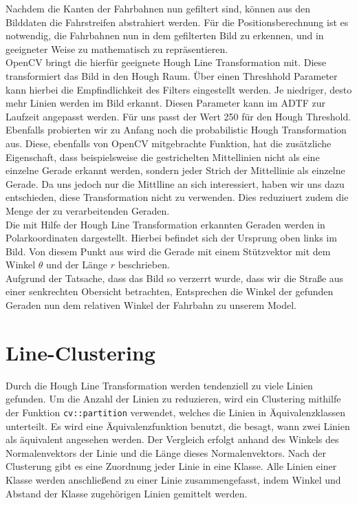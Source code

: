 \documentclass[a4paper,12pt]{report}
\begin{document}
	Nachdem die Kanten der Fahrbahnen nun gefiltert sind, können aus den Bilddaten die Fahrstreifen abstrahiert werden. Für die Positionsberechnung ist es notwendig, die Fahrbahnen nun in dem gefilterten Bild zu erkennen, und in geeigneter Weise zu mathematisch zu repräsentieren. \\
	OpenCV bringt die hierfür geeignete Hough Line Transformation mit. Diese transformiert das Bild in den Hough Raum. Über einen Threshhold Parameter kann hierbei die Empfindlichkeit des Filters eingestellt werden. Je niedriger, desto mehr Linien werden im Bild erkannt. Diesen Parameter kann im ADTF zur Laufzeit angepasst werden. Für uns passt der Wert 250 für den Hough Threshold.\\
	Ebenfalls probierten wir zu Anfang noch die probabilistic Hough Transformation aus. Diese, ebenfalls von OpenCV mitgebrachte Funktion, hat die zusätzliche Eigenschaft, dass beispielsweise die gestrichelten Mittellinien nicht als eine einzelne Gerade erkannt werden, sondern jeder Strich der Mittellinie als einzelne Gerade. Da uns jedoch nur die Mittlline an sich interessiert, haben wir uns dazu entschieden, diese Transformation nicht zu verwenden. Dies reduziuert zudem die Menge der zu verarbeitenden Geraden.\\
	Die mit Hilfe der Hough Line Transformation erkannten Geraden werden in Polarkoordinaten dargestellt. Hierbei befindet sich der Ursprung oben links im Bild. Von diesem Punkt aus wird die Gerade mit einem Stützvektor mit dem Winkel $\theta$ und der Länge $r$ beschrieben.\\
	Aufgrund der Tatsache, dass das Bild so verzerrt wurde, dass wir die Straße aus einer senkrechten Obersicht betrachten, Entsprechen die Winkel der gefunden Geraden nun dem relativen Winkel der Fahrbahn zu unserem Model.

\section{Line-Clustering}
	Durch die Hough Line Transformation werden tendenziell zu viele Linien gefunden. Um die Anzahl der Linien zu reduzieren, wird ein Clustering mithilfe der Funktion \texttt{cv::partition} verwendet, welches die Linien in Äquivalenzklassen unterteilt. Es wird eine Äquivalenzfunktion benutzt, die besagt, wann zwei Linien als äquivalent angesehen werden. Der Vergleich erfolgt anhand des Winkels des Normalenvektors der Linie und die Länge dieses Normalenvektors. Nach der Clusterung gibt es eine Zuordnung jeder Linie in eine Klasse. Alle Linien einer Klasse werden anschließend zu einer Linie zusammengefasst, indem Winkel und Abstand der Klasse zugehörigen Linien gemittelt werden.
\end{document}
